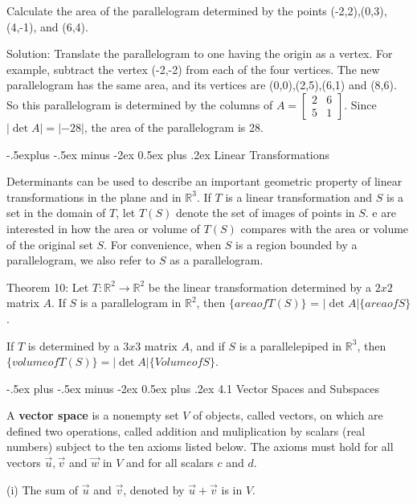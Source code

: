 \documentclass[10pt,landscape]{article}
\makeatletter
\renewcommand{\section}{\@startsection{section}{1}{0mm}%
                                {-.5ex plus -.5ex minus -2ex}%
                                {0.5ex plus .2ex}%
                                {\normalfont\footnotesize\bfseries}}
\renewcommand{\subsection}{\@startsection{subsection}{2}{0mm}%
                                {-.5explus -.5ex minus -2ex}%
                                {0.5ex plus .2ex}%
                                {\normalfont\footnotesize\bfseries}}
\makeatother
\begin{document}
\begin{multicols}{4}
{{Calculate the area of the parallelogram determined by the points (-2,2),(0,3),(4,-1), and (6,4). 

Solution: Translate the parallelogram to one having the origin as a vertex. For example, subtract the vertex (-2,-2) from each of the four vertices. The new parallelogram has the same area, and its vertices are (0,0),(2,5),(6,1) and (8,6).  So this parallelogram is determined by the columns of $A = \left[\begin{array}{rrr}2 & 6\\5 & 1\end{array}\right]$. Since $|\det A| = |-28|$, the area of the parallelogram is 28. 

\subsection{Linear Transformations}

Determinants can be used to describe an important geometric property of linear transformations in the plane and in $\mathbb{R}^3$. If $T$ is a linear transformation and $S$ is a set in the domain of $T$, let $T(S)$ denote the set of images of points in $S$. e are interested in how the area or volume of $T(S)$ compares with the area or volume of the original set $S$. For convenience, when $S$ is a region bounded by a parallelogram, we also refer to $S$ as a parallelogram.

\medskip

Theorem 10: Let $T: \mathbb{R}^2 \to \mathbb{R}^2$ be the linear transformation determined by a $2x2$ matrix $A$. If $S$ is a parallelogram in $\mathbb{R}^2$, then $\{area of T(S)\}$ = $|\det A|\{area of S\}$. 

If $T$ is determined by a $3x3$ matrix $A$, and if $S$ is a parallelepiped in $\mathbb{R}^3$, then $\{volume of T(S)\} = |\det A|\{Volume of S\}$. 

\section{4.1 Vector Spaces and Subspaces}

A \textbf{vector space} is a nonempty set $V$ of objects, called vectors, on which are defined two operations, called addition and muliplication by scalars (real numbers) subject to the ten axioms listed below. The axioms must hold for all vectors $\vec{u}, \vec{v}$ and $\vec{w}$ in $V$ and for all scalars $c$ and $d$. 

(i) The sum of $\vec{u}$ and $\vec{v}$, denoted by $\vec{u}+\vec{v}$ is in $V$. 

}}
\end{multicols}
\end{document}
